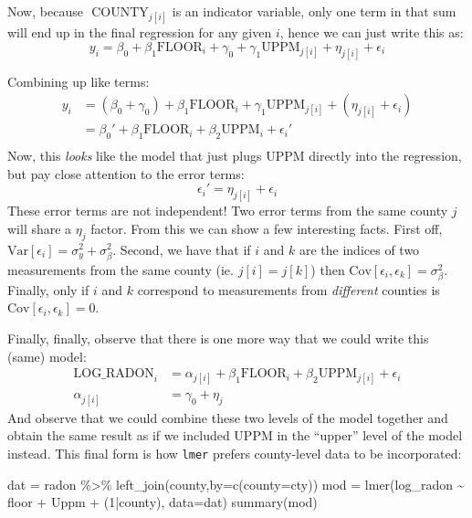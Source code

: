 \documentclass[
]{article}
\newenvironment{Shaded}{\begin{snugshade}}{\end{snugshade}}
\newcommand{\AttributeTok}[1]{\textcolor[rgb]{0.77,0.63,0.00}{#1}}
\newcommand{\DecValTok}[1]{\textcolor[rgb]{0.00,0.00,0.81}{#1}}
\newcommand{\FunctionTok}[1]{\textcolor[rgb]{0.00,0.00,0.00}{#1}}
\newcommand{\NormalTok}[1]{#1}
\newcommand{\OtherTok}[1]{\textcolor[rgb]{0.56,0.35,0.01}{#1}}
\newcommand{\SpecialCharTok}[1]{\textcolor[rgb]{0.00,0.00,0.00}{#1}}
\newcommand{\StringTok}[1]{\textcolor[rgb]{0.31,0.60,0.02}{#1}}
\begin{document}
Now, because \(\text{ COUNTY}_{j[i]}\) is an indicator variable, only
one term in that sum will end up in the final regression for any given
\(i\), hence we can just write this as: \[
y_i = \beta_0 + \beta_1 \text{FLOOR}_i + \gamma_0 + \gamma_1 \text{UPPM}_{j[i]} + \eta_{j[i]} + \epsilon_i
\]

Combining up like terms: \[
\begin{split}
y_i &= (\beta_0 + \gamma_0) + \beta_1 \text{FLOOR}_i + \gamma_1 \text{UPPM}_{j[i]} + (\eta_{j[i]} + \epsilon_i)\\
&= \beta_0' + \beta_1 \text{FLOOR}_i + \beta_2 \text{UPPM}_i + \epsilon_i'\\
\end{split}
\] Now, this \emph{looks} like the model that just plugs UPPM directly
into the regression, but pay close attention to the error terms: \[
\epsilon_i' = \eta_{j[i]} + \epsilon_i
\] These error terms are not independent! Two error terms from the same
county \(j\) will share a \(\eta_{j}\) factor. From this we can show a
few interesting facts. First off,
\(\text{Var}[\epsilon_i] = \sigma^2_y + \sigma^2_{\beta}\). Second, we
have that if \(i\) and \(k\) are the indices of two measurements from
the same county (ie. \(j[i]=j[k]\)) then
\(\text{Cov}[\epsilon_i,\epsilon_k] = \sigma^2_{\beta}\). Finally, only
if \(i\) and \(k\) correspond to measurements from \emph{different}
counties is \(\text{Cov}[\epsilon_i,\epsilon_k] =0\).

Finally, finally, observe that there is one more way that we could write
this (same) model: \[
\begin{split}
\text{LOG_RADON}_i &= \alpha_{j[i]} + \beta_1 \text{FLOOR}_i + \beta_2 \text{UPPM}_{j[i]} + \epsilon_i\\
\alpha_{j[i]} &=  \gamma_0 + \eta_j
\end{split}
\] And observe that we could combine these two levels of the model
together and obtain the same result as if we included UPPM in the
``upper'' level of the model instead. This final form is how
\texttt{lmer} prefers county-level data to be incorporated:

\begin{Shaded}
\begin{Highlighting}[]
\NormalTok{dat }\OtherTok{=}\NormalTok{ radon }\SpecialCharTok{\%\textgreater{}\%} \FunctionTok{left\_join}\NormalTok{(county,}\AttributeTok{by=}\FunctionTok{c}\NormalTok{(}\StringTok{\textquotesingle{}county\textquotesingle{}}\OtherTok{=}\StringTok{\textquotesingle{}cty\textquotesingle{}}\NormalTok{))}
\NormalTok{mod }\OtherTok{=} \FunctionTok{lmer}\NormalTok{(log\_radon }\SpecialCharTok{\textasciitilde{}}\NormalTok{ floor }\SpecialCharTok{+}\NormalTok{ Uppm }\SpecialCharTok{+}\NormalTok{ (}\DecValTok{1}\SpecialCharTok{|}\NormalTok{county), }\AttributeTok{data=}\NormalTok{dat)}
\FunctionTok{summary}\NormalTok{(mod)}
\end{Highlighting}
\end{Shaded}
\end{document}

